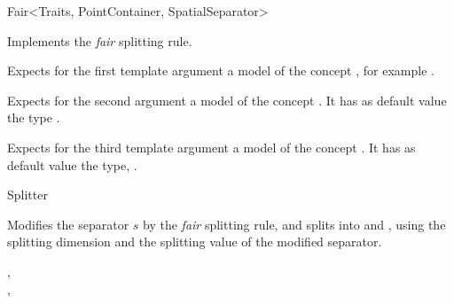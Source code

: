 

\begin{ccRefFunctionObjectClass}{Fair<Traits, PointContainer, SpatialSeparator>}  %


\ccDefinition
Implements the {\em fair} splitting rule.  

\ccParameters

Expects for the first template argument a model of
the concept , 
for example . 

Expects for the second argument a model of the concept . 
It has as default value the type .

Expects for the third template argument a model of the concept . 
It has as default value the type, .


\ccInheritsFrom {}

\ccIsModel

Splitter

\ccTypes




\ccOperations

{Modifies the separator $s$ by the {\em fair} splitting rule, 
and splits  into  and ,
using the splitting dimension and the splitting value of the modified separator.}

\ccSeeAlso

,\\
,\\

\end{ccRefFunctionObjectClass}


